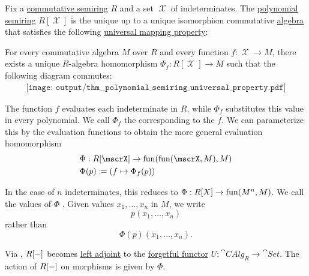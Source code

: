 \begin{proposition}\label{thm:polynomial_semiring_universal_property}
  Fix a \hyperref[def:semiring/commutative]{commutative semiring} \( R \) and a set \( \mscrX \) of indeterminates. The \hyperref[def:polynomial_semiring]{polynomial semiring} \( R[\mscrX] \) is the unique up to a unique isomorphism commutative \hyperref[def:algebra_over_semiring]{algebra} that satisfies the following \hyperref[rem:universal_mapping_property]{universal mapping property}:
  \begin{displayquote}
    For every commutative algebra \( M \) over \( R \) and every function \( f: \mscrX \to M \), there exists a unique \( R \)-algebra homomorphism \( \Phi_f: R[\mscrX] \to M \) such that the following diagram commutes:
    \begin{equation}\label{eq:thm:free_semimodule_universal_property/diagram}
      \begin{aligned}
        \texttt{[image: output/thm\_\_polynomial\_semiring\_universal\_property.pdf]}
      \end{aligned}
    \end{equation}
  \end{displayquote}

  The function \( f \) evaluates each indeterminate in \( R \), while \( \Phi_f \) substitutes this value in every polynomial. We call \( \Phi_f \) the  corresponding to the  \( f \). We can parameterize this by the evaluation functions to obtain the more general evaluation homomorphism
  \begin{equation*}
    \begin{aligned}
      &\Phi: R[\mscrX] \to \fun(\fun(\mscrX, M), M) \\
      &\Phi(p) \coloneqq (f \mapsto \Phi_f(p))
    \end{aligned}
  \end{equation*}

  In the case of \( n \) indeterminates, this reduces to \( \Phi: R[X] \to \operatorname{fun}(M^n, M) \). We call the values of \( \Phi \) . Given values \( x_1, \ldots, x_n \) in \( M \), we write
  \begin{equation*}
    p(x_1, \ldots, x_n)
  \end{equation*}
  rather than
  \begin{equation*}
    \Phi(p)(x_1, \ldots, x_n).
  \end{equation*}

  Via , \( R[\anon*] \) becomes \hyperref[def:category_adjunction]{left adjoint} to the \hyperref[def:concrete_category]{forgetful functor} \( U: \cat{CAlg}_R \to \cat{Set} \). The action of \( R[\anon*] \) on morphisms is given by \( \Phi \).
\end{proposition}
